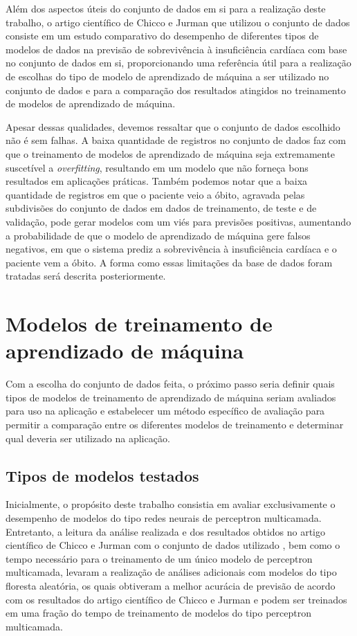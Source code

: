 Além dos aspectos úteis do conjunto de dados em si para a realização deste trabalho, o artigo científico de Chicco e Jurman que utilizou o conjunto de dados consiste em um estudo comparativo do desempenho de diferentes tipos de modelos de dados na previsão de sobrevivência à insuficiência cardíaca com base no conjunto de dados em si, proporcionando uma referência útil para a realização de escolhas do tipo de modelo de aprendizado de máquina a ser utilizado no conjunto de dados e para a comparação dos resultados atingidos no treinamento de modelos de aprendizado de máquina.

Apesar dessas qualidades, devemos ressaltar que o conjunto de dados escolhido não é sem falhas. A baixa quantidade de registros no conjunto de dados faz com que o treinamento de modelos de aprendizado de máquina seja extremamente suscetível a \textit{overfitting}, resultando em um modelo que não forneça bons resultados em aplicações práticas. Também podemos notar que a baixa quantidade de registros em que o paciente veio a óbito, agravada pelas subdivisões do conjunto de dados em dados de treinamento, de teste e de validação, pode gerar modelos com um viés para previsões positivas, aumentando a probabilidade de que o modelo de aprendizado de máquina gere falsos negativos, em que o sistema prediz a sobrevivência à insuficiência cardíaca e o paciente vem a óbito. A forma como essas limitações da base de dados foram tratadas será descrita posteriormente.

\section{Modelos de treinamento de aprendizado de máquina}

Com a escolha do conjunto de dados feita, o próximo passo seria definir quais tipos de modelos de treinamento de aprendizado de máquina seriam avaliados para uso na aplicação e estabelecer um método específico de avaliação para permitir a comparação entre os diferentes modelos de treinamento e determinar qual deveria ser utilizado na aplicação.

\subsection{Tipos de modelos testados}

Inicialmente, o propósito deste trabalho consistia em avaliar exclusivamente o desempenho de modelos do tipo redes neurais de perceptron multicamada. Entretanto, a leitura da análise realizada e dos resultados obtidos no artigo científico de Chicco e Jurman \cite{chicco2020} com o conjunto de dados utilizado \cite{larxel_dataset}, bem como o tempo necessário para o treinamento de um único modelo de perceptron multicamada, levaram a realização de análises adicionais com modelos do tipo floresta aleatória, os quais obtiveram a melhor acurácia de previsão de acordo com os resultados do artigo científico de Chicco e Jurman e podem ser treinados em uma fração do tempo de treinamento de modelos do tipo perceptron multicamada.

